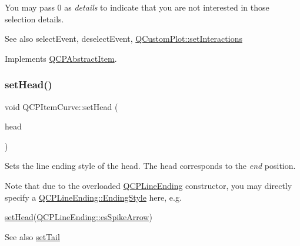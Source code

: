 You may pass 0 as {\itshape details} to indicate that you are not interested in those selection details.

\begin{DoxySeeAlso}{See also}
select\+Event, deselect\+Event, \hyperlink{class_q_custom_plot_a5ee1e2f6ae27419deca53e75907c27e5}{Q\+Custom\+Plot\+::set\+Interactions} 
\end{DoxySeeAlso}


Implements \hyperlink{class_q_c_p_abstract_item_a96d522d10ffc0413b9a366c6f7f0476b}{Q\+C\+P\+Abstract\+Item}.

\hypertarget{class_q_c_p_item_curve_a08a30d9cdd63995deea3d9e20430676f}{}\label{class_q_c_p_item_curve_a08a30d9cdd63995deea3d9e20430676f} 
\subsubsection{\texorpdfstring{set\+Head()}{setHead()}}
{\footnotesize\ttfamily void Q\+C\+P\+Item\+Curve\+::set\+Head (\begin{DoxyParamCaption}\item[{const \hyperlink{class_q_c_p_line_ending}{Q\+C\+P\+Line\+Ending} \&}]{head }\end{DoxyParamCaption})}

Sets the line ending style of the head. The head corresponds to the {\itshape end} position.

Note that due to the overloaded \hyperlink{class_q_c_p_line_ending}{Q\+C\+P\+Line\+Ending} constructor, you may directly specify a \hyperlink{class_q_c_p_line_ending_a5ef16e6876b4b74959c7261d8d4c2cd5}{Q\+C\+P\+Line\+Ending\+::\+Ending\+Style} here, e.\+g.
\begin{DoxyCode}
\hyperlink{class_q_c_p_item_curve_a08a30d9cdd63995deea3d9e20430676f}{setHead}(\hyperlink{class_q_c_p_line_ending_a5ef16e6876b4b74959c7261d8d4c2cd5ab9964d0d03f812d1e79de15edbeb2cbf}{QCPLineEnding::esSpikeArrow}) 
\end{DoxyCode}


\begin{DoxySeeAlso}{See also}
\hyperlink{class_q_c_p_item_curve_ac3488d8b1a6489c845dc5bff3ef71124}{set\+Tail} 
\end{DoxySeeAlso}
\hypertarget{class_q_c_p_item_curve_a034be908440aec785c34b92843461221}{}\label{class_q_c_p_item_curve_a034be908440aec785c34b92843461221} 
